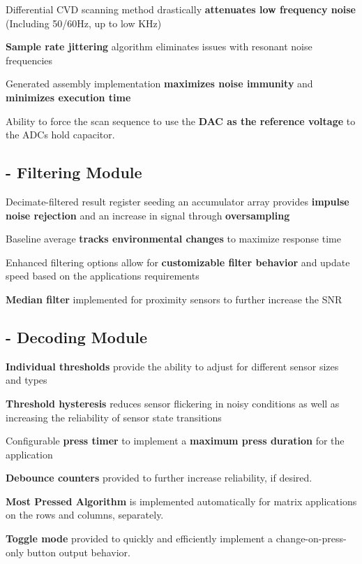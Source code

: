 \begin{DoxyItemize}
\item Differential C\+V\+D scanning method drastically {\bfseries attenuates low frequency noise} (Including 50/60\+Hz, up to low K\+Hz) \item {\bfseries Sample rate jittering} algorithm eliminates issues with resonant noise frequencies \item Generated assembly implementation {\bfseries maximizes noise immunity} and {\bfseries minimizes execution time} \item Ability to force the scan sequence to use the {\bfseries D\+A\+C as the reference voltage} to the A\+D\+C\textquotesingle{}s hold capacitor. \end{DoxyItemize}
\hypertarget{_framework_features_FilteringFeatures}{}\subsection{-\/ Filtering Module}\label{_framework_features_FilteringFeatures}
\begin{DoxyItemize}
\item Decimate-\/filtered result register seeding an accumulator array provides {\bfseries impulse noise rejection} and an increase in signal through {\bfseries oversampling} \item Baseline average {\bfseries tracks environmental changes} to maximize response time \item Enhanced filtering options allow for {\bfseries customizable filter behavior} and update speed based on the application\textquotesingle{}s requirements \item {\bfseries Median filter} implemented for proximity sensors to further increase the S\+N\+R \end{DoxyItemize}
\hypertarget{_framework_features_DecodingFeatures}{}\subsection{-\/ Decoding Module}\label{_framework_features_DecodingFeatures}
\begin{DoxyItemize}
\item {\bfseries Individual thresholds} provide the ability to adjust for different sensor sizes and types \item {\bfseries Threshold hysteresis} reduces sensor flickering in noisy conditions as well as increasing the reliability of sensor state transitions \item Configurable {\bfseries press timer} to implement a {\bfseries maximum press duration} for the application \item {\bfseries Debounce counters} provided to further increase reliability, if desired. \item {\bfseries Most Pressed Algorithm} is implemented automatically for matrix applications on the rows and columns, separately. \item {\bfseries Toggle mode} provided to quickly and efficiently implement a change-\/on-\/press-\/only button output behavior. \end{DoxyItemize}
